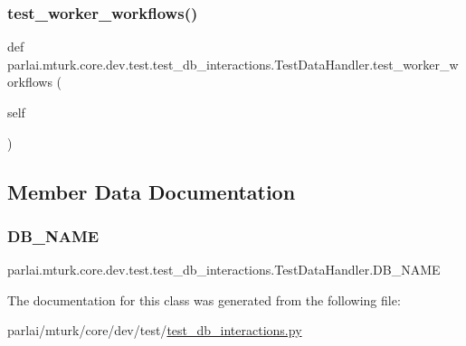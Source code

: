 \subsubsection{\texorpdfstring{test\+\_\+worker\+\_\+workflows()}{test\_worker\_workflows()}}
{\footnotesize\ttfamily def parlai.\+mturk.\+core.\+dev.\+test.\+test\+\_\+db\+\_\+interactions.\+Test\+Data\+Handler.\+test\+\_\+worker\+\_\+workflows (\begin{DoxyParamCaption}\item[{}]{self }\end{DoxyParamCaption})}



\subsection{Member Data Documentation}
\mbox{\label{classparlai_1_1mturk_1_1core_1_1dev_1_1test_1_1test__db__interactions_1_1TestDataHandler_a4b0aeed28095f156c18b021e12eb22f0}} 
\subsubsection{\texorpdfstring{D\+B\+\_\+\+N\+A\+ME}{DB\_NAME}}
{\footnotesize\ttfamily parlai.\+mturk.\+core.\+dev.\+test.\+test\+\_\+db\+\_\+interactions.\+Test\+Data\+Handler.\+D\+B\+\_\+\+N\+A\+ME\hspace{0.3cm}{\ttfamily [static]}}



The documentation for this class was generated from the following file\+:\begin{DoxyCompactItemize}
\item 
parlai/mturk/core/dev/test/\hyperlink{dev_2test_2test__db__interactions_8py}{test\+\_\+db\+\_\+interactions.\+py}\end{DoxyCompactItemize}
